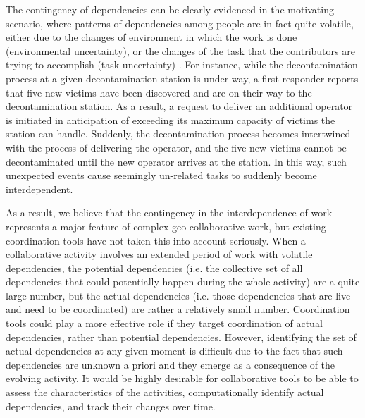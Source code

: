 The contingency of dependencies can be clearly evidenced in the motivating scenario, where patterns of dependencies among people are in fact quite volatile, either due to the changes of environment in which the work is done (environmental uncertainty), or the changes of the task that the contributors are trying to accomplish (task uncertainty) \cite{kittur2009coordination}. For instance, while the decontamination process at a given decontamination station is under way, a first responder reports that five new victims have been discovered and are on their way to the decontamination station. As a result, a request to deliver an additional operator is initiated in anticipation of exceeding its maximum capacity of victims the station can handle. Suddenly, the decontamination process becomes intertwined with the process of delivering the operator, and the five new victims cannot be decontaminated until the new operator arrives at the station. In this way, such unexpected events cause seemingly un-related tasks to suddenly become interdependent.

As a result, we believe that the contingency in the interdependence of work represents a major feature of complex geo-collaborative work, but existing coordination tools have not taken this into account seriously. When a collaborative activity involves an extended period of work with volatile dependencies, the potential dependencies (i.e. the collective set of all dependencies that could potentially happen during the whole activity) are a quite large number, but the actual dependencies (i.e. those dependencies that are live and need to be coordinated) are rather a relatively small number. Coordination tools could play a more effective role if they target coordination of actual dependencies, rather than potential dependencies. However, identifying the set of actual dependencies at any given moment is difficult due to the fact that such dependencies are unknown a priori and they emerge as a consequence of the evolving activity. It would be highly desirable for collaborative tools to be able to assess the characteristics of the activities, computationally identify actual dependencies, and track their changes over time. 

